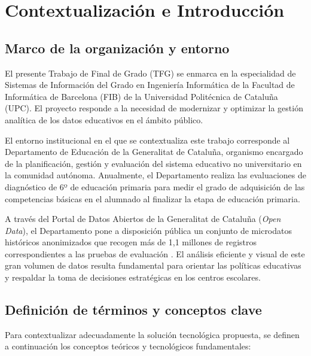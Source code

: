 \documentclass[12pt, a4paper, twoside]{report}
\begin{document}
\clearpage
{}

\tableofcontents %
\newpage
\listoftables    %

\clearpage
{}


\chapter{Contextualización e Introducción}

\section{Marco de la organización y entorno}
El presente Trabajo de Final de Grado (TFG) se enmarca en la especialidad de Sistemas de Información del Grado en Ingeniería Informática de la Facultad de Informática de Barcelona (FIB) de la Universidad Politécnica de Cataluña (UPC). El proyecto responde a la necesidad de modernizar y optimizar la gestión analítica de los datos educativos en el ámbito público.

El entorno institucional en el que se contextualiza este trabajo corresponde al Departamento de Educación de la Generalitat de Cataluña, organismo encargado de la planificación, gestión y evaluación del sistema educativo no universitario en la comunidad autónoma. Anualmente, el Departamento realiza las evaluaciones de diagnóstico de 6º de educación primaria para medir el grado de adquisición de las competencias básicas en el alumnado al finalizar la etapa de educación primaria.

A través del Portal de Datos Abiertos de la Generalitat de Cataluña (\textit{Open Data}), el Departamento pone a disposición pública un conjunto de microdatos históricos anonimizados que recogen más de 1,1 millones de registros correspondientes a las pruebas de evaluación \cite{transparencia_catalunya_2024}. El análisis eficiente y visual de este gran volumen de datos resulta fundamental para orientar las políticas educativas y respaldar la toma de decisiones estratégicas en los centros escolares.

\section{Definición de términos y conceptos clave}
Para contextualizar adecuadamente la solución tecnológica propuesta, se definen a continuación los conceptos teóricos y tecnológicos fundamentales:
\end{document}
